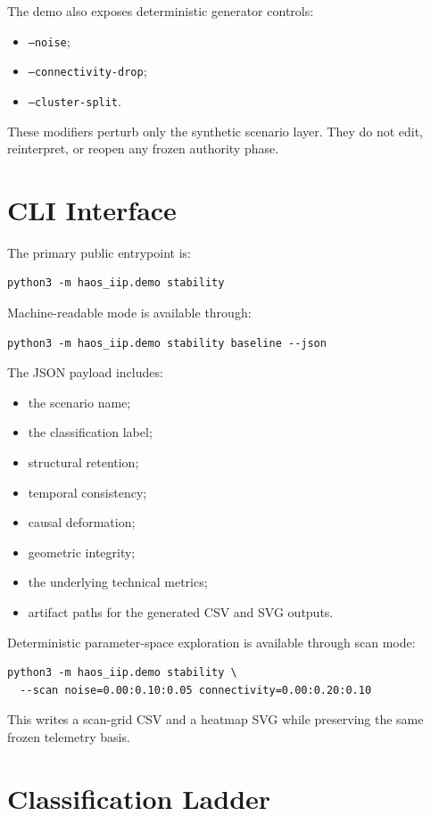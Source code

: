 \documentclass[11pt]{article}
\begin{document}
The demo also exposes deterministic generator controls:
\begin{itemize}
\item \texttt{--noise};
\item \texttt{--connectivity-drop};
\item \texttt{--cluster-split}.
\end{itemize}

These modifiers perturb only the synthetic scenario layer. They do not edit, reinterpret, or reopen any frozen authority phase.

\section{CLI Interface}

The primary public entrypoint is:
\begin{verbatim}
python3 -m haos_iip.demo stability
\end{verbatim}

Machine-readable mode is available through:
\begin{verbatim}
python3 -m haos_iip.demo stability baseline --json
\end{verbatim}

The JSON payload includes:
\begin{itemize}
\item the scenario name;
\item the classification label;
\item structural retention;
\item temporal consistency;
\item causal deformation;
\item geometric integrity;
\item the underlying technical metrics;
\item artifact paths for the generated CSV and SVG outputs.
\end{itemize}

Deterministic parameter-space exploration is available through scan mode:
\begin{verbatim}
python3 -m haos_iip.demo stability \
  --scan noise=0.00:0.10:0.05 connectivity=0.00:0.20:0.10
\end{verbatim}

This writes a scan-grid CSV and a heatmap SVG while preserving the same frozen telemetry basis.

\section{Classification Ladder}
\end{document}

